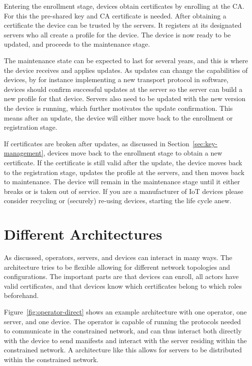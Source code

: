 \documentclass[0-thesis.tex]{subfiles}
\begin{document}
Entering the enrollment stage, devices obtain certificates by enrolling at the CA. For
this the pre-shared key and CA certificate is needed. After obtaining a certificate the
device can be trusted by the servers. It registers at its designated servers who all
create a profile for the device. The device is now ready to be updated, and proceeds to
the maintenance stage.

The maintenance state can be expected to last for several years, and this is where the
device receives and applies updates. As updates can change the capabilities of devices, by
for instance implementing a new transport protocol in software, devices should confirm
successful updates at the server so the server can build a new profile for that device.
Servers also need to be updated with the new version the device is running, which further
motivates the update confirmation. This means after an update, the device will either move
back to the enrollment or registration stage.

If certificates are broken after updates, as discussed in Section~\ref{sec:key-management},
devices move back to the enrollment stage to obtain a new certificate. If the certificate
is still valid after the update, the device moves back to the registration stage, updates
the profile at the servers, and then moves back to maintenance. The device will remain in
the maintenance stage until it either breaks or is taken out of service. If you are a
manufacturer of IoT devices please consider recycling or (securely) re-using devices,
starting the life cycle anew.


\section{Different Architectures}
\label{ssec:different-architectures}
As discussed, operators, servers, and devices can interact in many ways. The architecture
tries to be flexible allowing for different network topologies and configurations. The
important parts are that devices can enroll, all actors have valid certificates, and that
devices know which certificates belong to which roles beforehand. 

Figure~\ref{fig:operator-direct} shows an example architecture with one operator, one
server, and one device. The operator is capable of running the protocols needed to
communicate in the constrained network, and can thus interact both directly with the
device to send manifests and interact with the server residing within the constrained
network. A architecture like this allows for servers to be distributed within the
constrained network.
\end{document}
